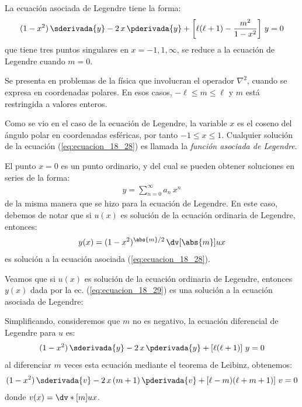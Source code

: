 La ecuación asociada de Legendre tiene la forma:
\begin{align}
(1 - x^{2}) \, \sderivada{y} - 2 \, x \, \pderivada{y} + \left[ \ell (\ell + 1) - \dfrac{m^{2}}{1 - x^{2}} \right] \, y = 0
\label{eq:ecuacion_18_28}
\end{align}
que tiene tres puntos singulares en $x = -1, 1, \infty$, se reduce a la ecuación de Legendre cuando $m = 0$.
\par
Se presenta en problemas de la física que involucran el operador $\nabla^{2}$, cuando se expresa en coordenadas polares. En esos casos, $- \ell \leq m \leq \ell$ y $m$ está restringida a valores enteros.
\par
Como se vio en el caso de la ecuación de Legendre, la variable $x$ es el coseno del ángulo polar en coordenadas esféricas, por tanto $-1 \leq x \leq 1$. Cualquier solución de la ecuación (\ref{eq:ecuacion_18_28}) es llamada la \emph{función asociada de Legendre}.
\par
El punto $x = 0$ es un punto ordinario, y del cual se pueden obtener soluciones en series de la forma:
\begin{align*}
y = \sum_{n=0}^{\infty} a_{n} \, x^{n}
\end{align*}
de la misma manera que se hizo para la ecuación de Legendre. En este caso, debemos de notar que si $u(x)$ es solución de la ecuación ordinaria de Legendre, entonces:
\begin{align}
y (x) = (1 -x^{2})^{\abs{m}/2} \, \dv[\abs{m}]{u}{x}
\label{eq:ecuacion_18_29}
\end{align}
es solución a la ecuación asociada (\ref{eq:ecuacion_18_28}).
\par
Veamos que si $u (x)$ es solución de la ecuación ordinaria de Legendre, entonces $y (x)$ dada por la ec. (\ref{eq:ecuacion_18_29}) es una solución a la ecuación asociada de Legendre:
\par
Simplificando, consideremos que $m$ no es negativo, la ecuación diferencial de Legendre para $u$ es:
\begin{align*}
(1 - x^{2}) \, \sderivada{y} - 2 \, x \, \pderivada{y} + \left[ \ell (\ell + 1) \right] \, y = 0
\end{align*}
al diferenciar $m$ veces esta ecuación mediante el teorema de Leibinz, obtenemos:
\begin{align}
(1 - x^{2}) \, \sderivada{v} - 2 \, x \, (m + 1) \, \pderivada{v} + \left[ \ell - m) (\ell + m + 1) \right] \, v = 0
\label{eq:ecuacion_18_30}
\end{align}
donde $v (x) = \dv*[m]{u}{x}$.
